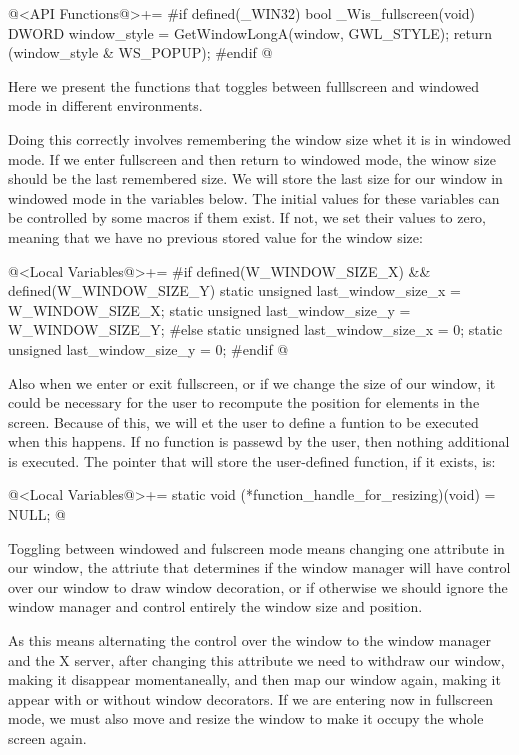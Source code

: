 \iniciocodigo
@<API Functions@>+=
#if defined(_WIN32)
bool _Wis_fullscreen(void){
  DWORD window_style = GetWindowLongA(window, GWL_STYLE);
  return (window_style & WS_POPUP);
}
#endif
@


Here we present the functions that toggles between fulllscreen and
windowed mode in different environments.

Doing this correctly involves remembering the window size whet it is
in windowed mode. If we enter fullscreen and then return to windowed
mode, the winow size should be the last remembered size. We will store
the last size for our window in windowed mode in the variables
below. The initial values for these variables can be controlled by
some macros if them exist. If not, we set their values to zero,
meaning that we have no previous stored value for the window size:

\iniciocodigo
@<Local Variables@>+=
#if defined(W_WINDOW_SIZE_X) && defined(W_WINDOW_SIZE_Y)
static unsigned last_window_size_x = W_WINDOW_SIZE_X;
static unsigned last_window_size_y = W_WINDOW_SIZE_Y;
#else
static unsigned last_window_size_x = 0;
static unsigned last_window_size_y = 0;
#endif
@
\fimcodigo

Also when we enter or exit fullscreen, or if we change the size of our
window, it could be necessary for the user to recompute the position
for elements in the screen. Because of this, we will et the user to
define a funtion to be executed when this happens. If no function is
passewd by the user, then nothing additional is executed. The pointer
that will store the user-defined function, if it exists, is:

\iniciocodigo
@<Local Variables@>+=
static void (*function_handle_for_resizing)(void) = NULL;
@
\fimcodigo


Toggling between windowed and fulscreen mode means changing one
attribute in our window, the attriute that determines if the window
manager will have control over our window to draw window decoration,
or if otherwise we should ignore the window manager and control
entirely the window size and position.

As this means alternating the control over the window to the window
manager and the X server, after changing this attribute we need to
withdraw our window, making it disappear momentaneally, and then map
our window again, making it appear with or without window
decorators. If we are entering now in fullscreen mode, we must also
move and resize the window to make it occupy the whole screen again.

